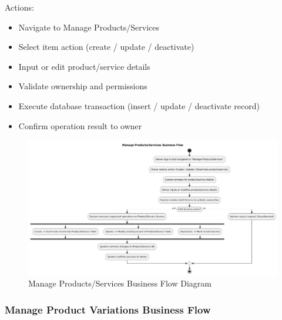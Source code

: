 \documentclass[]{VUMIFTemplateClass}
\begin{document}
Actions:
\begin{itemize}
\setlength{\itemsep}{2pt}
\setlength{\parskip}{0pt}
\setlength{\parsep}{0pt}
\item Navigate to Manage Products/Services
\item Select item action (create / update / deactivate)
\item Input or edit product/service details
\item Validate ownership and permissions
\item Execute database transaction (insert / update / deactivate record)
\item Confirm operation result to owner
\end{itemize}

\begin{figure}[H]
    \centering
    \includegraphics[width=1\textwidth]{images/diagrams/business/bpmn_products_services.png}
    \caption{Manage Products/Services Business Flow Diagram}
    \label{fig:product_service_manage_flow}
\end{figure}

\subsubsection{Manage Product Variations Business Flow}
\end{document}

